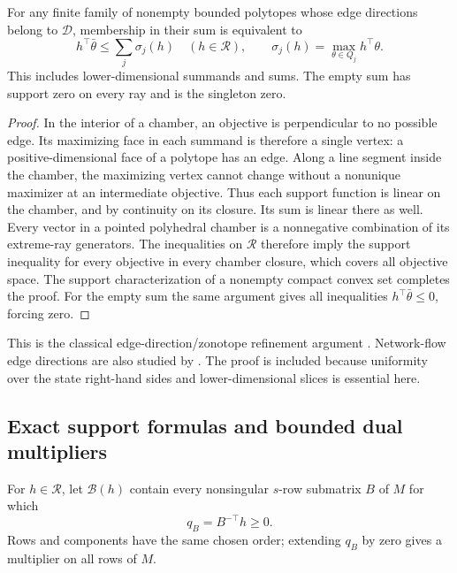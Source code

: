 \begin{lemma}\label{lem:rank-support-library}
For any finite family of nonempty bounded polytopes whose edge directions
belong to $\mathcal D$, membership in their sum is equivalent to
\begin{equation}\label{eq:rank-support-tests}
 h^\top\bar\theta\le\sum_j\sigma_j(h)\quad(h\in\mathcal R),\qquad
 \sigma_j(h)=\max_{\theta\in Q_j}h^\top\theta.
\end{equation}
This includes lower-dimensional summands and sums. The empty sum has
support zero on every ray and is the singleton zero.
\end{lemma}
\begin{proof}
In the interior of a chamber, an objective is perpendicular to no
possible edge. Its maximizing face in each summand is therefore a single
vertex: a positive-dimensional face of a polytope has an edge. Along
a line segment inside the chamber, the maximizing vertex cannot change
without a nonunique maximizer at an intermediate objective. Thus each
support function is linear on the chamber, and by continuity on its
closure. Its sum is linear there as well. Every vector in a pointed
polyhedral chamber is a nonnegative combination of its extreme-ray
generators. The inequalities on $\mathcal R$ therefore imply the support
inequality for every objective in every chamber closure, which covers
all objective space. The support characterization of a nonempty compact
convex set completes the proof. For the empty sum the same argument
gives all inequalities $h^\top\bar\theta\le0$, forcing zero.
\end{proof}

This is the classical edge-direction/zonotope refinement argument
\citep{GritzmannSturmfels1993,OnnRothblum2004,OnnRozenblit2014}.
Network-flow edge directions are also studied by
\citet{OnnRothblumTangir2005}. The proof is included because uniformity
over the state right-hand sides and lower-dimensional slices is essential
here.

\subsection{Exact support formulas and bounded dual multipliers}\label{subsec:rank-duals}
For $h\in\mathcal R$, let $\mathcal B(h)$ contain every nonsingular
$s$-row submatrix $B$ of $M$ for which
\begin{equation}\label{eq:rank-dual-vector}
 q_B=B^{-\top}h\ge0.
\end{equation}
Rows and components have the same chosen order; extending $q_B$ by zero
gives a multiplier on all rows of $M$.

